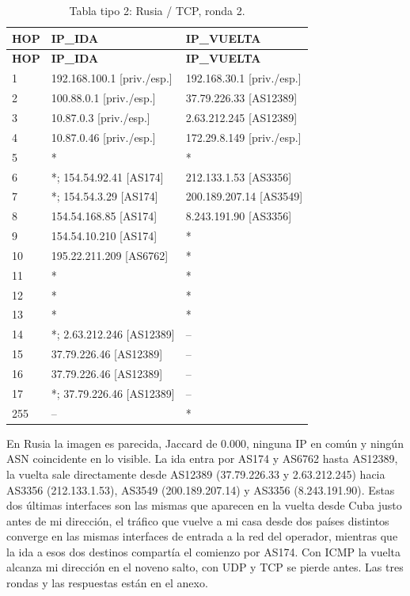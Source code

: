 \begin{longtable}{p{0.95cm}p{7.075cm}p{7.075cm}}
\caption{Tabla tipo 2: Rusia / TCP, ronda 2.}\label{tabla2:37.79.226.46:TCP} \\
\toprule
\textbf{HOP} & \textbf{IP\_\allowbreak{}IDA} & \textbf{IP\_\allowbreak{}VUELTA} \\ \midrule
\endfirsthead
\toprule
\textbf{HOP} & \textbf{IP\_\allowbreak{}IDA} & \textbf{IP\_\allowbreak{}VUELTA} \\ \midrule
\endhead
1 & 192.168.100.1 [priv./esp.] & 192.168.30.1 [priv./esp.] \\
2 & 100.88.0.1 [priv./esp.] & 37.79.226.33 [AS12389] \\
3 & 10.87.0.3 [priv./esp.] & 2.63.212.245 [AS12389] \\
4 & 10.87.0.46 [priv./esp.] & 172.29.8.149 [priv./esp.] \\
5 & * & * \\
6 & *; 154.54.92.41 [AS174] & 212.133.1.53 [AS3356] \\
7 & *; 154.54.3.29 [AS174] & 200.189.207.14 [AS3549] \\
8 & 154.54.168.85 [AS174] & 8.243.191.90 [AS3356] \\
9 & 154.54.10.210 [AS174] & * \\
10 & 195.22.211.209 [AS6762] & * \\
11 & * & * \\
12 & * & * \\
13 & * & * \\
14 & *; 2.63.212.246 [AS12389] & -- \\
15 & 37.79.226.46 [AS12389] & -- \\
16 & 37.79.226.46 [AS12389] & -- \\
17 & *; 37.79.226.46 [AS12389] & -- \\
255 & -- & * \\
\bottomrule
\end{longtable}
\endgroup

En Rusia la imagen es parecida, Jaccard de 0.000, ninguna IP en común y ningún ASN coincidente en lo visible. La ida entra por AS174 y AS6762 hasta AS12389, la vuelta sale directamente desde AS12389 (37.79.226.33 y 2.63.212.245) hacia AS3356 (212.133.1.53),  AS3549 (200.189.207.14) y AS3356 (8.243.191.90). Estas dos últimas interfaces son las mismas que aparecen en la vuelta desde Cuba justo antes de mi dirección, el tráfico que vuelve a mi casa desde dos países distintos converge en las mismas interfaces de entrada a la red del operador, mientras que la ida a esos dos destinos compartía el comienzo por AS174. Con ICMP la vuelta alcanza mi dirección en el noveno salto, con UDP y TCP se pierde antes. Las tres rondas y las respuestas están en el anexo.


